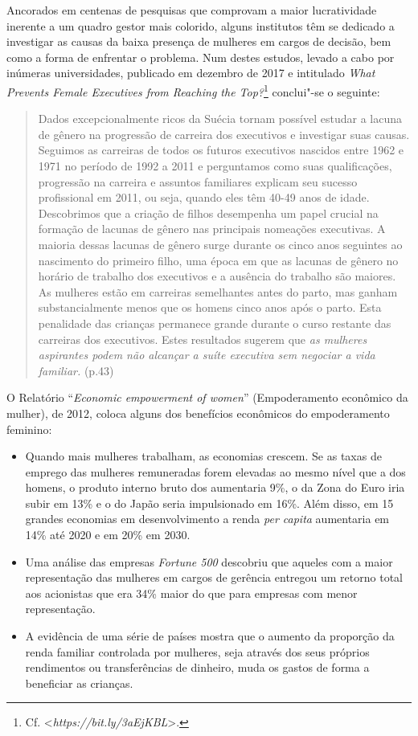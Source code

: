 Ancorados em centenas de pesquisas que comprovam a maior lucratividade
inerente a um quadro gestor mais colorido, alguns institutos têm se
dedicado a investigar as causas da baixa presença de mulheres em cargos
de decisão, bem como a forma de enfrentar o problema. Num destes
estudos, levado a cabo por inúmeras universidades, publicado em dezembro
de 2017 e intitulado \emph{What Prevents Female Executives from Reaching
the Top?}\footnote{Cf. \textless{}\emph{https://bit.ly/3aEjKBL}\textgreater{}.}
conclui"-se o seguinte:

\begin{quote}
Dados excepcionalmente ricos da Suécia tornam possível estudar a lacuna
de gênero na progressão de carreira dos executivos e investigar suas
causas. Seguimos as carreiras de todos os futuros executivos nascidos
entre 1962 e 1971 no período de 1992 a 2011 e perguntamos como suas
qualificações, progressão na carreira e assuntos familiares explicam seu
sucesso profissional em 2011, ou seja, quando eles têm 40-49 anos de
idade. Descobrimos que a criação de filhos desempenha um papel crucial
na formação de lacunas de gênero nas principais nomeações executivas. A
maioria dessas lacunas de gênero surge durante os cinco anos seguintes
ao nascimento do primeiro filho, uma época em que as lacunas de gênero
no horário de trabalho dos executivos e a ausência do trabalho são
maiores. As mulheres estão em carreiras semelhantes antes do parto, mas
ganham substancialmente menos que os homens cinco anos após o parto.
Esta penalidade das crianças permanece grande durante o curso restante
das carreiras dos executivos. Estes resultados sugerem que \emph{as
mulheres aspirantes podem não alcançar a suíte executiva sem negociar a
vida familiar.} (p.43)
\end{quote}

O Relatório ``\emph{Economic empowerment of women}'' (Empoderamento
econômico da mulher), de 2012, coloca alguns dos benefícios econômicos
do empoderamento feminino:

\begin{itemize}

\item Quando mais mulheres trabalham, as economias crescem. Se as taxas de
emprego das mulheres remuneradas forem elevadas ao mesmo nível que a dos
homens, o produto interno bruto dos  aumentaria 9\%, o da Zona do
Euro iria subir em 13\% e o do Japão seria impulsionado em 16\%. Além
disso, em 15 grandes economias em desenvolvimento a renda \emph{per
capita} aumentaria em 14\% até 2020 e em 20\% em 2030.

\item Uma análise das empresas \emph{Fortune 500} descobriu que aqueles com
a maior representação das mulheres em cargos de gerência entregou um
retorno total aos acionistas que era 34\% maior do que para empresas com
menor representação.

\item A evidência de uma série de países mostra que o aumento da proporção
da renda familiar controlada por mulheres, seja através dos seus
próprios rendimentos ou transferências de dinheiro, muda os gastos de
forma a beneficiar as crianças.
\end{itemize}

